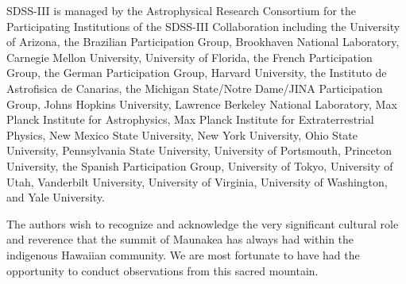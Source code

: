 \documentclass[]{pasj01}
\begin{document}
\begin{ack}
SDSS-III is managed by the Astrophysical Research Consortium for the Participating Institutions of the SDSS-III Collaboration including the University of Arizona, the Brazilian Participation Group, Brookhaven National Laboratory, Carnegie Mellon University, University of Florida, the French Participation Group, the German Participation Group, Harvard University, the Instituto de Astrofisica de Canarias, the Michigan State/Notre Dame/JINA Participation Group, Johns Hopkins University, Lawrence Berkeley National Laboratory, Max Planck Institute for Astrophysics, Max Planck Institute for Extraterrestrial Physics, New Mexico State University, New York University, Ohio State University, Pennsylvania State University, University of Portsmouth, Princeton University, the Spanish Participation Group, University of Tokyo, University of Utah, Vanderbilt University, University of Virginia, University of Washington, and Yale University.

The authors wish to recognize and acknowledge the very significant cultural role and reverence that the summit of Maunakea has always had within the indigenous Hawaiian community.
We are most fortunate to have had the opportunity to conduct observations from this sacred mountain.
\end{ack}
\end{document}

